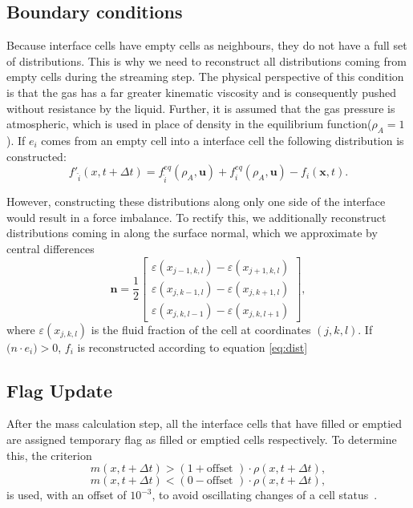 \documentclass[10pt,a4paper,notitlepage]{article}
\begin{document}
\subsection{Boundary conditions}
Because interface cells have empty cells as neighbours, they do not have a full set of distributions.
This is why we need to reconstruct all distributions coming from empty cells during the streaming step.
The physical perspective of this condition is that the gas has a far greater kinematic viscosity and is consequently pushed without resistance by the liquid.
Further, it is assumed that the gas pressure is atmospheric, which is used in place of density in the equilibrium function($\rho_{A} = 1$).
If $e_{i}$ comes from an empty cell into a interface cell the following distribution is constructed:
\begin{equation} \label{eq:dist}
f'_{\hat{i}} (x, t + \Delta t) = f^{eq}_{\hat{i}}(\rho_A, \mathbf{u})+f^{eq}_{{i}}(\rho_A, \mathbf{u})-f_{i}(\mathbf{x},t).
\end{equation}

However, constructing these distributions along only one side of the interface would result in a force imbalance.
To rectify this, we additionally reconstruct distributions coming in along the surface normal, which we approximate by central differences
\begin{equation} \label{eq:normal}
  \mathbf{n}=\frac{1}{2}\begin{bmatrix} \varepsilon(x_{j-1,k,l})-\varepsilon(x_{j+1,k,l})\\\varepsilon(x_{j,k-1,l})-\varepsilon(x_{j,k+1,l})
    \\
    \varepsilon(x_{j,k,l-1})-\varepsilon(x_{j,k,l+1} ) \end{bmatrix},
\end{equation}
where $\varepsilon(x_{j,k,l})$ is the fluid fraction of the cell at coordinates $(j,k,l)$.
If $\mathbf(n \cdot e_{i})>0$, $f_{i}$ is reconstructed according to equation \eqref{eq:dist}


\subsection{Flag Update}
After the mass calculation step, all the interface cells that have filled or emptied are assigned temporary flag as filled or emptied cells respectively.
To determine this, the criterion
\begin{equation} \label{eq:filled}
m(x,t+ \Delta t)>(1+ \text{offset }) \cdot \rho(x,t+\Delta t),
\end{equation}
\begin{equation} \label{eq:empty}
m(x,t+ \Delta t)<(0- \text{offset }) \cdot \rho(x,t+\Delta t),
\end{equation}
is used, with an offset of $10^{-3}$, to avoid oscillating changes of a cell status~\cite{thurey2007physically}.
\end{document}
